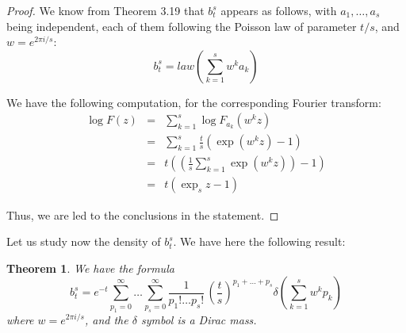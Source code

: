 \documentclass[12pt]{amsbook}
\newtheorem{theorem}{Theorem}[chapter]
\begin{document}
\begin{proof}
We know from Theorem 3.19 that $b^s_t$ appears as follows, with $a_1,\ldots,a_s$ being independent, each of them following the Poisson law of parameter $t/s$, and $w=e^{2\pi i/s}$:
$$b^s_t=law\left(\sum_{k=1}^sw^ka_k\right)$$

We have the following computation, for the corresponding Fourier transform:
\begin{eqnarray*}
\log F(z)
&=&\sum_{k=1}^s\log F_{a_k}(w^kz)\\
&=&\sum_{k=1}^s\frac{t}{s}\left(\exp(w^kz)-1\right)\\
&=&t\left(\left(\frac{1}{s}\sum_{k=1}^s\exp(w^kz)\right)-1\right)\\
&=&t\left(\exp_sz-1\right)
\end{eqnarray*}

Thus, we are led to the conclusions in the statement.
\end{proof}

Let us study now the density of $b^s_t$. We have here the following result:

\begin{theorem}
We have the formula
$$b^s_t=e^{-t}\sum_{p_1=0}^\infty\ldots\sum_{p_s=0}^\infty\frac{1}{p_1!\ldots p_s!}\,\left(\frac{t}{s}\right)^{p_1+\ldots+p_s}\delta\left(\sum_{k=1}^sw^kp_k\right)$$
where $w=e^{2\pi i/s}$, and the $\delta$ symbol is a Dirac mass.
\end{theorem}
\end{document}
